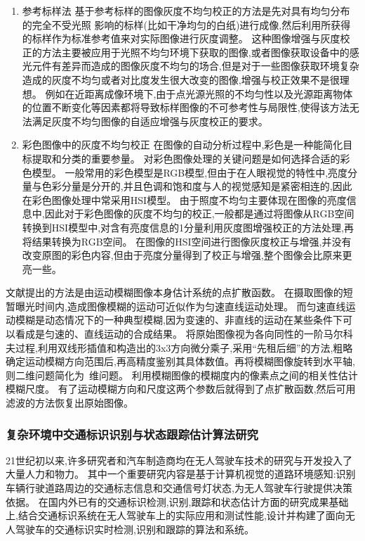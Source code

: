 \documentclass{amsart}
\begin{document}
\begin{enumerate}
\item 参考标样法
基于参考标样的图像灰度不均匀校正的方法是先对具有均匀分布的完全不受光照
影响的标样(比如干净均匀的白纸)进行成像,然后利用所获得的标样作为标准参考值来对实际图像进行灰度调整。
这种图像增强与灰度校正的方法主要被应用于光照不均匀环境下获取的图像,或者图像获取设备中的感光元件有差异而造成的图像灰度不均匀的场合,但是对于一些图像获取环境复杂造成的灰度不均匀或者对比度发生很大改变的图像,增强与校正效果不是很理想。
例如在近距离成像环境下,由于点光源光照的不均匀性以及光源距离物体的位置不断变化等因素都将导致标样图像的不可参考性与局限性,使得该方法无法满足灰度不均匀图像的自适应增强与灰度校正的要求。
\item 彩色图像中的灰度不均匀校正
  在图像的自动分析过程中,彩色是一种能简化目标提取和分类的重要参量。
  对彩色图像处理的关键问题是如何选择合适的彩色模型。
  一般常用的彩色模型是RGB模型,但由于在人眼视觉的特性中,亮度分量与色彩分量是分开的,并且色调和饱和度与人的视觉感知是紧密相连的,因此在彩色图像处理中常采用HSI模型。
  由于照度不均匀主要体现在图像的亮度信息中,因此对于彩色图像的灰度不均匀的校正,一般都是通过将图像从RGB空间转换到HSI模型中,对含有亮度信息的1分量利用灰度图增强校正的方法处理,再将结果转换为RGB空间。
  在图像的HSI空间进行图像灰度校正与增强,并没有改变原图的彩色内容,但由于亮度分量得到了校正与增强,整个图像会比原来更亮一些。
\end{enumerate}


文献\cite{马明}提出的方法是由运动模糊图像本身估计系统的点扩散函数。
在摄取图像的短暂曝光时间内,造成图像模糊的运动可近似作为匀速直线运动处理。
而匀速直线运动模糊是动态情况下的一种典型模糊,因为变速的、非直线的运动在某些条件下可以看成是匀速的、直线运动的合成结果。
将原始图像视为各向同性的一阶马尔科夫过程,利用双线形插值和构造出的3x3方向微分乘子,采用“先租后细”的方法,粗略确定运动模糊方向范围后,再高精度鉴别其具体数值。再将模糊图像旋转到水平轴,则二维问题简化为~维问题。
利用模糊图像的模糊度内的像素点之间的相关性估计模糊尺度。
有了运动模糊方向和尺度这两个参数后就得到了点扩散函数,然后可用滤波的方法恢复出原始图像。


\subsubsection{复杂环境中交通标识识别与状态跟踪估计算法研究}
21世纪初以来,许多研究者和汽车制造商均在无人驾驶车技术的研究与开发投入了大量人力和物力。
其中一个重要研究内容是基于计算机视觉的道路环境感知:识别车辆行驶道路周边的交通标志信息和交通信号灯状态,为无人驾驶车行驶提供决策依据。
在国内外已有的交通标识检测,识别,跟踪和状态估计方面的研究成果基础上,结合交通标识系统在无人驾驶车上的实际应用和测试性能,设计并构建了面向无人驾驶车的交通标识实时检测,识别和跟踪的算法和系统。
\end{document}
